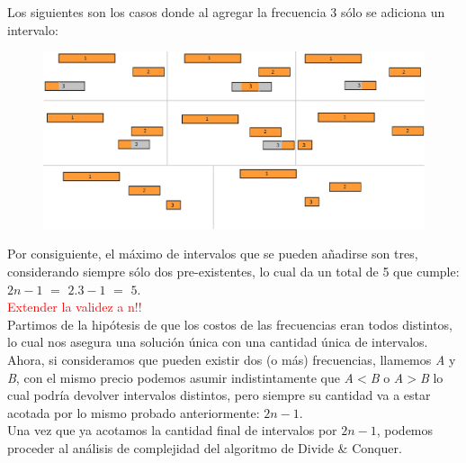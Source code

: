 Los siguientes son los casos donde al agregar la frecuencia $3$ s\'olo se adiciona un intervalo:
  \begin{figure}[h!]
   \begin{center}
 	\includegraphics[scale=0.2]{imagenes/ej2/secuencias/Paso2/todos1.png}
   \end{center}
 \end{figure}

Por consiguiente, el m\'aximo de intervalos que se pueden a\~nadirse son tres, considerando siempre s\'olo dos pre-existentes, lo cual da un total de 5 que cumple: $2n-1$ $=$ $2$.$3-1$ $=$ $5$.\\


\textcolor{red}{Extender la validez a n!!}\\


Partimos de la hip\'otesis de que los costos de las frecuencias eran todos distintos, lo cual nos asegura una soluci\'on \'unica con una cantidad \'unica de intervalos. Ahora, si consideramos que pueden existir dos (o m\'as) frecuencias, llamemos \emph{A} y \emph{B}, con el mismo precio podemos asumir indistintamente que \emph{A$<$B} o \emph{A$>$B} lo cual podr\'ia devolver intervalos distintos, pero siempre su cantidad va a estar acotada por lo mismo probado anteriormente: $2n-1$.\\

Una vez que ya acotamos la cantidad final de intervalos por $2n-1$, podemos proceder al an\'alisis de complejidad del algoritmo de Divide \& Conquer.

